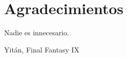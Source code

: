 %
%
%
%
%
%
%
%
%
%
%
%
%

\chapter{Agradecimientos}


\begin{FraseCelebre}
\begin{Frase}
Nadie es innecesario.
\end{Frase}
\begin{Fuente}
Yit\'an, Final Fantasy IX
\end{Fuente}
\end{FraseCelebre}

